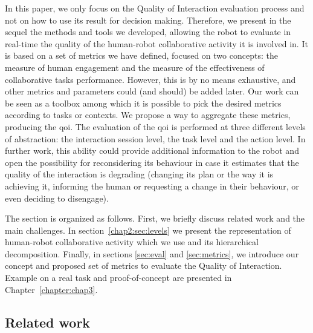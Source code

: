 \documentclass[a4paper,11pt,twoside]{StyleThese}
\begin{document}
In this paper, we only focus on the Quality of Interaction evaluation process and not on how to use its result for decision making. Therefore,  we present in the sequel the methods and tools we developed, allowing the robot to evaluate in real-time the quality of the human-robot collaborative activity it is involved in. It is based on a set of metrics we have defined, focused on two concepts: the measure of human engagement and the measure of the effectiveness of collaborative tasks performance. However, this is by no means exhaustive, and other metrics and parameters could (and should) be added later. Our work can be seen as a toolbox among which it is possible to pick the desired metrics according to tasks or contexts. We propose a way to aggregate these metrics, producing the \acrshort{qoi}. The evaluation of the \acrshort{qoi} is performed at three different levels of abstraction: the interaction session level, the task level and the action level. In further work, this ability could provide additional information to the robot and open the possibility for reconsidering its behaviour in case it estimates that the quality of the interaction is degrading (\eg changing its plan or the way it is achieving it, informing the human or requesting a change in their behaviour, or even deciding to disengage).

The section is organized as follows. First, we briefly discuss related work and the main challenges. In section~\ref{chap2:sec:levels} we present the representation of human-robot collaborative activity which we use and its hierarchical  decomposition. Finally, in sections \ref{sec:eval} and \ref{sec:metrics}, we introduce our concept and proposed set of metrics to evaluate the Quality of Interaction. Example on a real task and proof-of-concept are presented in Chapter~\ref{chapter:chap3}.

\subsection{Related work}\label{sec:rel}
\end{document}
